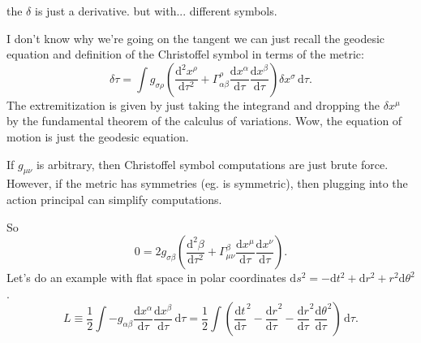 \begin{remark}
	the $\delta $ is just a derivative. but with... different symbols.
\end{remark}

I don't know why we're going on the tangent we can just recall the geodesic equation and definition of the Christoffel symbol in terms of the metric:
\[
	\delta \tau =\int g_{\sigma \rho } \left( \frac{\mathrm{d}^2x^\rho }{\mathrm{d}\tau ^2} +\Gamma _{\alpha \beta } ^\rho \frac{\mathrm{d}x^\alpha }{\mathrm{d}\tau } \frac{\mathrm{d}x^\beta }{\mathrm{d}\tau }  \right) \delta x^\sigma  \,\mathrm{d} \tau 
.\]
The extremitization is given by just taking the integrand and dropping the $\delta x^\mu $ by the fundamental theorem of the calculus of variations. Wow, the equation of motion is just the geodesic equation.

If $g_{\mu \nu } $ is arbitrary, then Christoffel symbol computations are just brute force. However, if the metric has symmetries (eg. is symmetric), then plugging into the action principal can simplify computations.


So
\[
	0=2g_{\sigma \beta } \left( \frac{\mathrm{d}^2\beta }{\mathrm{d}\tau ^2} +\Gamma _{\mu \nu } ^\beta \frac{\mathrm{d}x^\mu }{\mathrm{d}\tau } \frac{\mathrm{d}x^\nu }{\mathrm{d}\tau }  \right) 
.\]
Let's do an example with flat space in polar coordinates $\mathrm{d} s^2=-\mathrm{d} t^2+\mathrm{d} r^2+r^2 \mathrm{d} \theta ^2$.
\[
	L\equiv \frac{1}{2} \int -g_{\alpha \beta } \frac{\mathrm{d}x^\alpha }{\mathrm{d}\tau } \frac{\mathrm{d}x^\beta }{\mathrm{d}\tau }  \,\mathrm{d} \tau =\frac{1}{2} \int \left( \frac{\mathrm{d}t}{\mathrm{d}\tau } ^2-\frac{\mathrm{d}r}{\mathrm{d}\tau } ^2-\frac{\mathrm{d}r}{\mathrm{d}\tau } ^2 \frac{\mathrm{d}\theta }{\mathrm{d}\tau } ^2 \right)  \,\mathrm{d} \tau 
.\]
